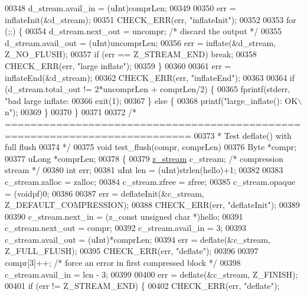 \begin{DoxyCode}
{{{{{{{{{{{{00348     d\_stream.avail\_in = (uInt)comprLen;
00349 
00350     err = inflateInit(&d\_stream);
00351     CHECK\_ERR(err, \textcolor{stringliteral}{"inflateInit"});
00352 
00353     \textcolor{keywordflow}{for} (;;) \{
00354         d\_stream.next\_out = uncompr;            \textcolor{comment}{/* discard the output */}
00355         d\_stream.avail\_out = (uInt)uncomprLen;
00356         err = inflate(&d\_stream, Z\_NO\_FLUSH);
00357         \textcolor{keywordflow}{if} (err == Z\_STREAM\_END) \textcolor{keywordflow}{break};
00358         CHECK\_ERR(err, \textcolor{stringliteral}{"large inflate"});
00359     \}
00360 
00361     err = inflateEnd(&d\_stream);
00362     CHECK\_ERR(err, \textcolor{stringliteral}{"inflateEnd"});
00363 
00364     \textcolor{keywordflow}{if} (d\_stream.total\_out != 2*uncomprLen + comprLen/2) \{
00365         fprintf(stderr, \textcolor{stringliteral}{"bad large inflate: %
00366         exit(1);
00367     \} \textcolor{keywordflow}{else} \{
00368         printf(\textcolor{stringliteral}{"large\_inflate(): OK\(\backslash\)n"});
00369     \}
00370 \}
00371 
00372 \textcolor{comment}{/* ===========================================================================}
00373 \textcolor{comment}{ * Test deflate() with full flush}
00374 \textcolor{comment}{ */}
00375 \textcolor{keywordtype}{void} test\_flush(compr, comprLen)
00376     Byte *compr;
00377     uLong *comprLen;
00378 \{
00379     \hyperlink{structz__stream__s}{z\_stream} c\_stream; \textcolor{comment}{/* compression stream */}
00380     \textcolor{keywordtype}{int} err;
00381     uInt len = (uInt)strlen(hello)+1;
00382 
00383     c\_stream.zalloc = zalloc;
00384     c\_stream.zfree = zfree;
00385     c\_stream.opaque = (voidpf)0;
00386 
00387     err = deflateInit(&c\_stream, Z\_DEFAULT\_COMPRESSION);
00388     CHECK\_ERR(err, \textcolor{stringliteral}{"deflateInit"});
00389 
00390     c\_stream.next\_in  = (z\_const \textcolor{keywordtype}{unsigned} \textcolor{keywordtype}{char} *)hello;
00391     c\_stream.next\_out = compr;
00392     c\_stream.avail\_in = 3;
00393     c\_stream.avail\_out = (uInt)*comprLen;
00394     err = deflate(&c\_stream, Z\_FULL\_FLUSH);
00395     CHECK\_ERR(err, \textcolor{stringliteral}{"deflate"});
00396 
00397     compr[3]++; \textcolor{comment}{/* force an error in first compressed block */}
00398     c\_stream.avail\_in = len - 3;
00399 
00400     err = deflate(&c\_stream, Z\_FINISH);
00401     \textcolor{keywordflow}{if} (err != Z\_STREAM\_END) \{
00402         CHECK\_ERR(err, \textcolor{stringliteral}{"deflate"});
}}}}}}}}}}}}}
\end{DoxyCode}
